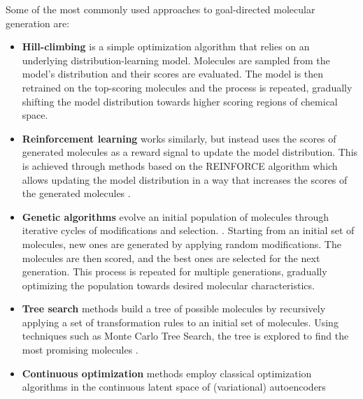 Some of the most commonly used approaches to goal-directed molecular generation are:
\begin{itemize}
	\item \textbf{Hill-climbing}
	      \citep{seglerGeneratingFocusedMolecule2018,xieMARSMarkovMolecular2020,thomasAugmentedHillClimbIncreases2022}
	      is a simple optimization algorithm that relies on an underlying distribution-learning model.
	      Molecules are sampled from the model's distribution and their scores are evaluated.
	      The model is then retrained on the top-scoring molecules and the process is repeated,
	      gradually shifting the model distribution towards higher scoring regions of chemical space.
	\item \textbf{Reinforcement learning} works similarly, but instead uses the scores of
	      generated molecules as a reward signal to update the model distribution. This is
	      achieved through methods based on the REINFORCE algorithm
	      \citep{williamsSimpleStatisticalGradientfollowing1992} which allows updating the model
	      distribution in a way that increases the scores of the generated molecules
	      \citep{olivecronaMolecularDenovoDesign2017,thomasAugmentedHillClimbIncreases2022,youGraphConvolutionalPolicy2018,guoAugmentedMemorySampleEfficient2024}.
	\item \textbf{Genetic algorithms} evolve an initial population of molecules through iterative
	      cycles of modifications and selection.
	      \citep{jensenGraphbasedGeneticAlgorithm2019,nigamGenerativeModelsSuperfast2021,yoshikawaPopulationbasedNovoMolecule2018}.
	      Starting from an initial set of molecules, new ones are generated by applying random
	      modifications. The molecules are then scored, and the best ones are selected for the next
	      generation. This process is repeated for multiple generations, gradually optimizing the
	      population towards desired molecular characteristics.
	\item \textbf{Tree search} methods build a tree of possible molecules by recursively applying a set of transformation rules
	      to an initial set of molecules. Using techniques such as Monte Carlo Tree Search, the tree is
	      explored to find the most promising molecules \citep{yangChemTSEfficientPython2017,jensenGraphbasedGeneticAlgorithm2019}.
	\item \textbf{Continuous optimization} methods employ classical optimization algorithms in the
	      continuous latent space of (variational) autoencoders
	      \citep{gomez-bombarelliAutomaticChemicalDesign2018,kusnerGrammarVariationalAutoencoder2017,winterEfficientMultiobjectiveMolecular2019}

\end{itemize}
